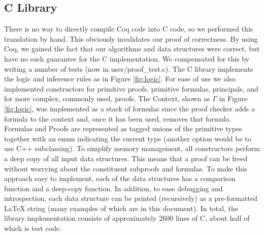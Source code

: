 \documentclass[10pt]{article}
\begin{document}
\subsection{C Library} \label{sec:clib}
There is no way to directly compile Coq code into C code, so we performed this translation by hand.  This obviously invalidates our proof of correctness.  By using Coq, we gained the fact that our algorithms and data structures were correct, but have no such guarantee for the C implementation.  We compensated for this by writing a number of tests (now in \textsf{user/proof\_test.c}).  The C library implements the logic and inference rules as in Figure \ref{fig:logic}.  For ease of use we also implemented constructors for primitive proofs, primitive formulas, principals, and for more complex, commonly used, proofs.  The Context, shown as $\Gamma$ in Figure \ref{fig:logic}, was implemented as a stack of formulas since the proof checker adds a formula to the context and, once it has been used, removes that formula.  Formulas and Proofs are represented as tagged \textsf{union}s of the primitive types together with an \textsf{enum} indicating the current type (another option would be to use C++ subclassing).  
\newline\newline
To simplify memory management, all constructors perform a deep copy of all input data structures.  This means that a proof can be freed without worrying about the constituent subproofs and formulas.  To make this approach easy to implement, each of the data structures has a comparison function and a deep-copy function.  In addition, to ease debugging and introspection, each data structure can be printed (recursively) as a pre-formatted \LaTeX{ }string (many examples of which are in this document).  In total, the library implementation consists of approximately 2600 lines of C, about half of which is test code.
\end{document}
